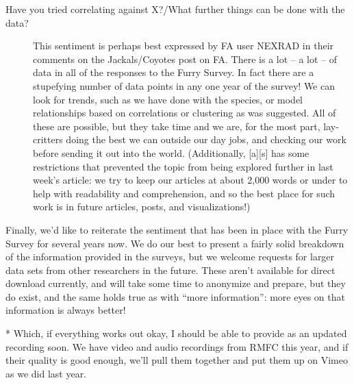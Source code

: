 \begin{description}
  \item[Have you tried correlating against X?/What further things can be done with the data?] This sentiment is perhaps best expressed by FA user NEXRAD in their comments on the Jackals/Coyotes post on FA.  There is a lot -- a lot -- of data in all of the responses to the Furry Survey.  In fact there are a stupefying number of data points in any one year of the survey!  We can look for trends, such as we have done with the species, or model relationships based on correlations or clustering as was suggested.  All of these are possible, but they take time and we are, for the most part, lay-critters doing the best we can outside our day jobs, and checking our work before sending it out into the world.  (Additionally, [a][s] has some restrictions that prevented the topic from being explored further in last week's article: we try to keep our articles at about 2,000 words or under to help with readability and comprehension, and so the best place for such work is in future articles, posts, and visualizations!)
\end{description}

Finally, we'd like to reiterate the sentiment that has been in place with the Furry Survey for several years now.  We do our best to present a fairly solid breakdown of the information provided in the surveys, but we welcome requests for larger data sets from other researchers in the future.  These aren't available for direct download currently, and will take some time to anonymize and prepare, but they do exist, and the same holds true as with ``more information'': more eyes on that information is always better!

* Which, if everything works out okay, I should be able to provide as an updated recording soon.  We have video and audio recordings from RMFC this year, and if their quality is good enough, we'll pull them together and put them up on Vimeo as we did last year.
